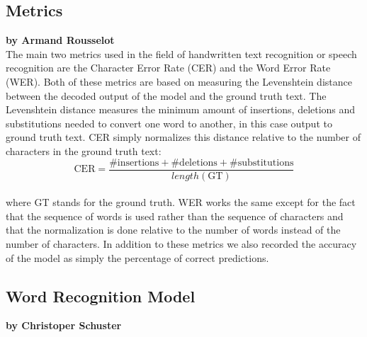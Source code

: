\documentclass{article}
\begin{document}
\subsection{Metrics}

\textbf{by Armand Rousselot} \\

The main two metrics used in the field of handwritten text recognition or speech recognition are the Character Error Rate (CER) and the Word Error Rate (WER). Both of these metrics are based on measuring the Levenshtein distance between the decoded output of the model and the ground truth text. The Levenshtein distance measures the minimum amount of insertions, deletions and substitutions needed to convert one word to another, in this case output to ground truth text. CER simply normalizes this distance relative to the number of characters in the ground truth text:\\
\[
\text{CER} = \frac{\text{\#insertions}+\text{\#deletions}+\text{\#substitutions}}{length(\text{GT})}
\]\\ 
where GT stands for the ground truth. WER works the same except for the fact that the sequence of words is used rather than the sequence of characters and that the normalization is done relative to the number of words instead of the number of characters. In addition to these metrics we also recorded the accuracy of the model as simply the percentage of correct predictions.
\subsection{Word Recognition Model}

\textbf{by Christoper Schuster} \\
\end{document}
